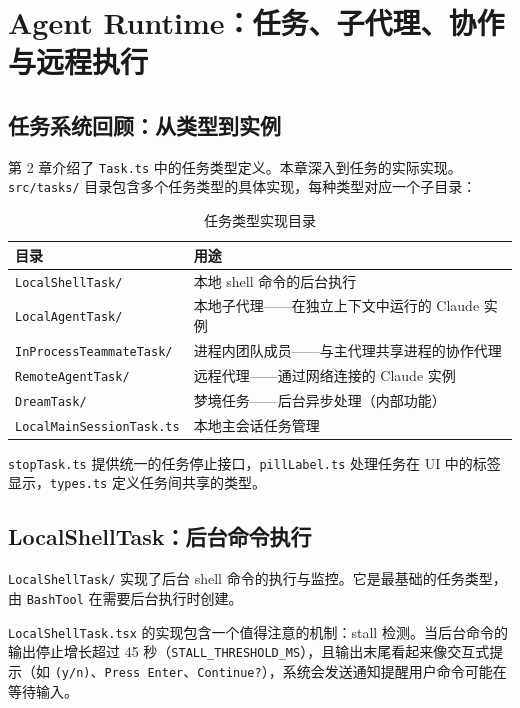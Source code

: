 \chapter{Agent Runtime：任务、子代理、协作与远程执行}

\section{任务系统回顾：从类型到实例}

第 2 章介绍了 \texttt{Task.ts} 中的任务类型定义。本章深入到任务的实际实现。\texttt{src/tasks/} 目录包含多个任务类型的具体实现，每种类型对应一个子目录：

\begin{table}[htbp]
\centering
\begin{tabularx}{\textwidth}{lX}
\toprule
\textbf{目录} & \textbf{用途} \\
\midrule
\texttt{LocalShellTask/} & 本地 shell 命令的后台执行 \\
\texttt{LocalAgentTask/} & 本地子代理——在独立上下文中运行的 Claude 实例 \\
\texttt{InProcessTeammateTask/} & 进程内团队成员——与主代理共享进程的协作代理 \\
\texttt{RemoteAgentTask/} & 远程代理——通过网络连接的 Claude 实例 \\
\texttt{DreamTask/} & 梦境任务——后台异步处理（内部功能） \\
\texttt{LocalMainSessionTask.ts} & 本地主会话任务管理 \\
\bottomrule
\end{tabularx}
\caption{任务类型实现目录}
\end{table}

\texttt{stopTask.ts} 提供统一的任务停止接口，\texttt{pillLabel.ts} 处理任务在 UI 中的标签显示，\texttt{types.ts} 定义任务间共享的类型。

\section{LocalShellTask：后台命令执行}

\texttt{LocalShellTask/} 实现了后台 shell 命令的执行与监控。它是最基础的任务类型，由 \texttt{BashTool} 在需要后台执行时创建。

\texttt{LocalShellTask.tsx} 的实现包含一个值得注意的机制：stall 检测。当后台命令的输出停止增长超过 45 秒（\texttt{STALL\_THRESHOLD\_MS}），且输出末尾看起来像交互式提示（如 \texttt{(y/n)}、\texttt{Press Enter}、\texttt{Continue?}），系统会发送通知提醒用户命令可能在等待输入。

